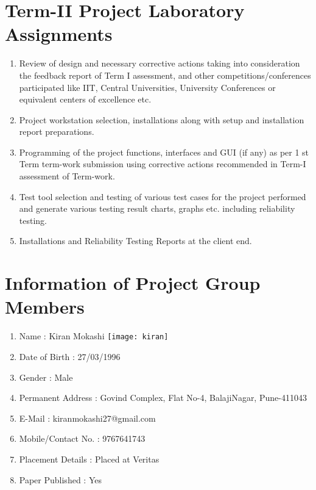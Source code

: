\documentclass[oneside,a4paper,12pt]{book}
\begin{document}
\begin{enumerate}
\begin{itemize}
\begin{appendices}
\chapter{ Term-II Project Laboratory Assignments}
\begin{enumerate}
\item Review of design and necessary corrective actions taking into consideration the feedback report of Term I assessment, and other competitions/conferences participated like IIT, Central Universities, University Conferences or equivalent centers of excellence etc.
\item Project workstation selection, installations along with setup and installation report preparations.
\item Programming of the project functions, interfaces and GUI (if any) as per 1 st Term term-work submission using corrective actions recommended in Term-I assessment of Term-work.
\item Test tool selection and testing of various test cases for the project performed and generate various testing result charts, graphs etc. including reliability testing.\\

\item Installations and Reliability Testing Reports at the client end.

\end{enumerate}


\chapter{Information of Project Group Members}
\begin{enumerate}
\item Name : Kiran Mokashi \hspace{90 mm}\texttt{[image: kiran]}
\item Date of Birth : 27/03/1996
\item Gender : Male
\item Permanent Address : Govind Complex, Flat No-4, BalajiNagar, Pune-411043
\item E-Mail : kiranmokashi27@gmail.com
\item Mobile/Contact No. : 9767641743
\item Placement Details : Placed at Veritas
\item Paper Published : Yes

\end{enumerate}




\end{appendices}
\end{itemize}
\end{enumerate}
\end{document}
